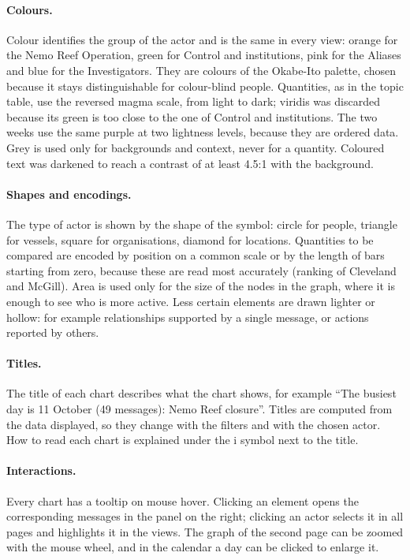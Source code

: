 \documentclass[11pt,a4paper]{article}
\begin{document}
\paragraph{Colours.} Colour identifies the group of the actor and is the same in every view: orange for the Nemo Reef
Operation, green for Control and institutions, pink for the Aliases and blue for the Investigators. They are colours of
the Okabe-Ito palette, chosen because it stays distinguishable for colour-blind people. Quantities, as in
the topic table, use the reversed magma scale, from light to dark; viridis was discarded because its green is too
close to the one of Control and institutions. The two weeks use the same purple at two lightness levels, because they
are ordered data. Grey is used only for backgrounds and context, never for a quantity. Coloured text was darkened to
reach a contrast of at least 4.5:1 with the background.

\paragraph{Shapes and encodings.} The type of actor is shown by the shape of the symbol: circle for people, triangle
for vessels, square for organisations, diamond for locations. Quantities to be compared are encoded by position on a
common scale or by the length of bars starting from zero, because these are read most accurately (ranking of Cleveland
and McGill). Area is used only for the size of the nodes in the graph, where it is enough to see who is more active. Less
certain elements are drawn lighter or hollow: for example relationships supported by a single message, or actions
reported by others.

\paragraph{Titles.} The title of each chart describes what the chart shows, for example ``The busiest day is
11 October (49 messages): Nemo Reef closure''. Titles are computed from the data displayed, so they change with the
filters and with the chosen actor. How to read each chart is explained under the \textsf{i} symbol next to the title.

\paragraph{Interactions.} Every chart has a tooltip on mouse hover. Clicking an element opens the corresponding
messages in the panel on the right; clicking an actor selects it in all pages and highlights it in the views. The graph
of the second page can be zoomed with the mouse wheel, and in the calendar a day can be clicked to enlarge it.
\end{document}
